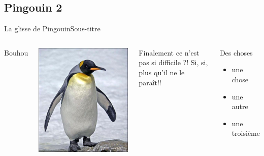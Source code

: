 \documentclass[usenames,dvipsnames, 12pt]{beamer}
\begin{document}
 \subsection{Pingouin 2}
 \begin{frame}{La glisse de Pingouin}{Sous-titre}
	\begin{columns}	
	\begin{center}
		Bouhou
	\end{center}
	\includegraphics[angle = 90, width = 1.\textwidth]{Pingouin}
	
  Finalement ce n'est pas si difficile ?! Si, si, plus qu'il ne le paraît!!
  		\begin{block}{Des choses}
  			\begin{itemize}
  			\item<1-3>	une chose
  			\item<2>	une autre
  			\item<3>	une troisième
  			\end{itemize}
  		\end{block}
  		\end{columns}
 \end{frame}
\end{document}
